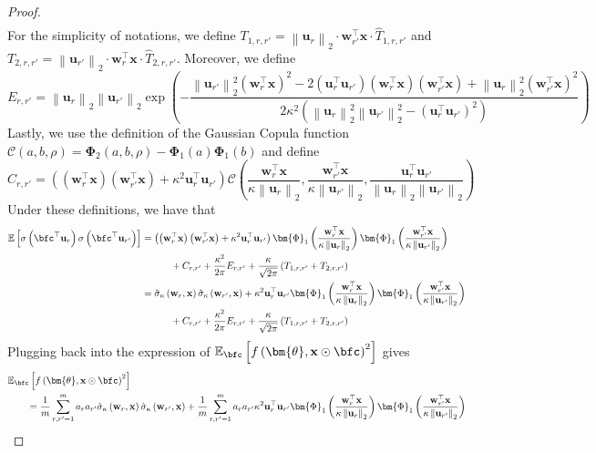 \documentclass[10pt]{article} %
\theoremstyle{definition}
\theoremstyle{plain}
\newcommand{\paren}[1]{\left(#1\right)}
\newcommand{\norm}[1]{\left\|#1\right\|}
\newcommand{\act}[2]{\hat{\sigma}_{\kappa}\paren{#1,#2}}
\providecommand{\E}{\mathbb{E}}
\def\bfu{{\mathbf{u}}}\def\bfv{{\mathbf{v}}}\def\bfw{{\mathbf{w}}}\def\bfx{{\mathbf{x}}}
\begin{document}
\begin{proof}
\begin{align*}
    \end{align*}
    For the simplicity of notations, we define $T_{1,r,r'} = \norm{\bfu_r}_2\cdot\bfw_{r'}^\top\bfx \cdot \hat{T}_{1,r,r'}$ and $T_{2,r,r'} = \norm{\bfu_{r'}}_2\cdot\bfw_{r}^\top\bfx \cdot \hat{T}_{2,r,r'}$. Moreover, we define
    \[
        E_{r,r'} = \norm{\bfu_r}_2\norm{\bfu_{r'}}_2\exp\paren{-\frac{\norm{\bfu_{r'}}_2^2\paren{\bfw_r^\top\bfx}^2-2\paren{\bfu_r^\top\bfu_{r'}}\paren{\bfw_r^\top\bfx}\paren{\bfw_{r'}^\top\bfx} + \norm{\bfu_r}_2^2\paren{\bfw_{r'}^\top\bfx}^2}{2\kappa^2\paren{\norm{\bfu_r}_2^2\norm{\bfu_{r'}}_2^2-\paren{\bfu_r^\top\bfu_{r'}}^2}}}
    \]
    Lastly, we use the definition of the Gaussian Copula function $\mathcal{C}\paren{a, b, \rho} = \bm{\Phi}_2\paren{a,b,\rho} - \bm{\Phi}_1\paren{a}\bm{\Phi}_1\paren{b}$ and define
    \[
        C_{r,r'} = \paren{\paren{\bfw_r^\top\bfx}\paren{\bfw_{r'}^\top\bfx} + \kappa^2\bfu_r^\top\bfu_{r'}}\mathcal{C}\paren{\frac{\bfw_r^\top\bfx}{\kappa\norm{\bfu_r}_2},\frac{\bfw_{r'}^\top\bfx}{\kappa\norm{\bfu_{r'}}_2},\frac{\bfu_r^\top\bfu_{r'}}{\norm{\bfu_r}_2\norm{\bfu_{r'}}_2}}
    \]
    Under these definitions, we have that
    \begin{align*}
        \E\left[\sigma\paren{\bfc^\top\bfu_r}\sigma\paren{\bfc^\top\bfu_{r'}}\right] & = \paren{\paren{\bfw_r^\top\bfx}\paren{\bfw_{r'}^\top\bfx} + \kappa^2\bfu_r^\top\bfu_{r'}}\bm{\Phi}_1\paren{\frac{\bfw_r^\top\bfx}{\kappa\norm{\bfu_r}_2}}\bm{\Phi}_1\paren{\frac{\bfw_{r'}^\top\bfx}{\kappa\norm{\bfu_{r'}}_2}}\\
        & \quad\quad\quad + C_{r,r'} + \frac{\kappa^2}{2\pi}E_{r,r'} + \frac{\kappa}{\sqrt{2\pi}}\paren{T_{1,r,r'} + T_{2,r,r'}}\\
        & = \act{\bfw_r}{\bfx}\act{\bfw_{r'}}{\bfx} + \kappa^2\bfu_r^\top\bfu_{r'}\bm{\Phi}_1\paren{\frac{\bfw_r^\top\bfx}{\kappa\norm{\bfu_r}_2}}\bm{\Phi}_1\paren{\frac{\bfw_{r'}^\top\bfx}{\kappa\norm{\bfu_{r'}}_2}}\\
        & \quad\quad\quad + C_{r,r'} + \frac{\kappa^2}{2\pi}E_{r,r'} + \frac{\kappa}{\sqrt{2\pi}}\paren{T_{1,r,r'} + T_{2,r,r'}}\\
    \end{align*}
    Plugging back into the expression of $\E_{\bfc}\left[f\paren{\bm{\theta},\bfx\odot\bfc}^2\right]$ gives
    \begin{align*}
        & \E_{\bfc}\left[f\paren{\bm{\theta},\bfx\odot\bfc}^2\right]\\
        &\quad\quad = \frac{1}{m}\sum_{r,r'=1}^ma_ra_{r'}\act{\bfw_r}{\bfx}\act{\bfw_{r'}}{\bfx} + \frac{1}{m}\sum_{r,r'=1}^ma_ra_{r'}\kappa^2\bfu_r^\top\bfu_{r'}\bm{\Phi}_1\paren{\frac{\bfw_r^\top\bfx}{\kappa\norm{\bfu_r}_2}}\bm{\Phi}_1\paren{\frac{\bfw_{r'}^\top\bfx}{\kappa\norm{\bfu_{r'}}_2}}\\

\end{align*}
\end{proof}
\end{document}

